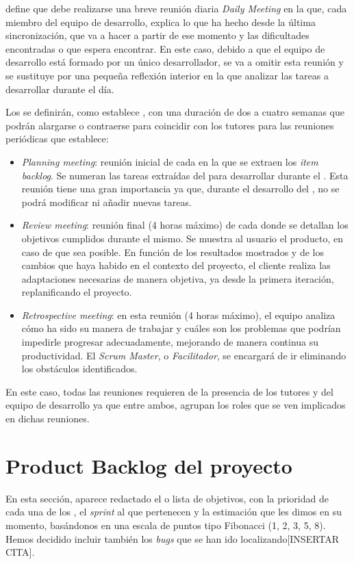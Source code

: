 
\scrum{} define que debe realizarse una breve reunión diaria \textit{Daily Meeting} en la que, cada miembro del equipo de desarrollo, explica lo que ha hecho desde la última sincronización, que va a hacer a partir de ese momento y las dificultades encontradas o que espera encontrar. En este caso, debido a que el equipo de desarrollo está formado por un único desarrollador, se va a omitir esta reunión y se sustituye por una pequeña reflexión interior en la que analizar las tareas a desarrollar durante el día.

Los \sprints{} se definirán, como establece \scrum{}, con una duración de dos a cuatro semanas que podrán alargarse o contraerse para coincidir con los tutores para las reuniones periódicas que establece:
\begin{itemize}
 \item \textit{Planning meeting}: reunión inicial de cada \sprint{} en la que se extraen los \textit{item backlog}. Se numeran las tareas extraídas del \productbacklog{} para desarrollar durante el \sprint{}. Esta reunión tiene una gran importancia ya que, durante el desarrollo del \sprint{}, no se podrá modificar ni añadir nuevas tareas.
 \item \textit{Review meeting}: reunión final (4 horas máximo) de cada \sprint{} donde se detallan los objetivos cumplidos durante el mismo. Se muestra al usuario el producto, en caso de que sea posible. En función de los resultados mostrados y de los cambios que haya habido en el contexto del proyecto, el cliente realiza las adaptaciones necesarias de manera objetiva, ya desde la primera iteración, replanificando el proyecto.
 \item \textit{Retrospective meeting}: en esta reunión (4 horas máximo), el equipo analiza cómo ha sido su manera de trabajar y cuáles son los problemas que podrían impedirle progresar adecuadamente, mejorando de manera continua su productividad. El \textit{Scrum Master}, o \textit{Facilitador}, se encargará de ir eliminando los obstáculos identificados.
\end{itemize}

En este caso, todas las reuniones requieren de la presencia de los tutores y del equipo de desarrollo ya que entre ambos, agrupan los roles que se ven implicados en dichas reuniones.
\newpage



\section{Product Backlog del proyecto}
En esta sección, aparece redactado el \productbacklog{}  o lista de objetivos, con la prioridad de cada una de los \productitem{}, el \textit{sprint} al que pertenecen y la estimación que les dimos en su momento, basándonos en una escala de puntos tipo Fibonacci (1, 2, 3, 5, 8). Hemos decidido incluir también los \textit{bugs} que se han ido localizando[INSERTAR CITA].

